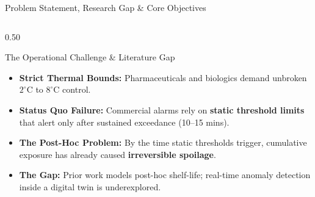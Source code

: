 \documentclass[aspectratio=169, 10pt]{beamer}
\begin{document}
\begin{frame}{Problem Statement, Research Gap \& Core Objectives}
    \begin{columns}[T]
        \begin{column}{0.50\textwidth}
            \begin{block}{The Operational Challenge \& Literature Gap}
                \begin{itemize}\small
                    \item \textbf{Strict Thermal Bounds:} Pharmaceuticals and biologics demand unbroken $2^\circ\text{C}$ to $8^\circ\text{C}$ control.
                    \item \textbf{Status Quo Failure:} Commercial alarms rely on \textbf{static threshold limits} that alert only after sustained exceedance (10--15 mins).
                    \item \textbf{The Post-Hoc Problem:} By the time static thresholds trigger, cumulative exposure has already caused \textbf{irreversible spoilage}.
                    \item \textbf{The Gap:} Prior work models post-hoc shelf-life; real-time anomaly detection inside a digital twin is underexplored.
                \end{itemize}
            \end{block}
        \end{column}
        

\end{columns}
\end{frame}
\end{document}
